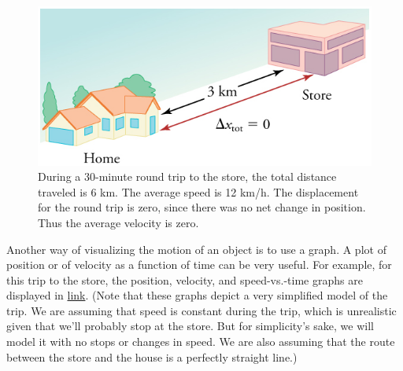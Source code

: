 \documentclass[
]{book}
\begin{document}
\begin{figure}
\hypertarget{import-auto-id2593426}{%
\centering
\includegraphics{images/Figure_02_02_02.jpg}
\caption{During a 30-minute round trip to the store, the total distance
traveled is 6 km. The average speed is 12 km/h. The displacement for the
round trip is zero, since there was no net change in position. Thus the
average velocity is
zero.}\label{import-auto-id2593426}
}
\end{figure}

Another way of visualizing the motion of an object is to use a graph. A
plot of position or of velocity as a function of time can be very
useful. For example, for this trip to the store, the position, velocity,
and speed-vs.-time graphs are displayed in
\protect\hyperlink{import-auto-id1806646}{link}. (Note that these
graphs depict a very simplified \protect\hypertarget{import-auto-id1510828}{}{model} of the trip. We are assuming that speed is constant
during the trip, which is unrealistic given that we'll probably stop at
the store. But for simplicity's sake, we will model it with no stops or
changes in speed. We are also assuming that the route between the store
and the house is a perfectly straight line.)
\end{document}
